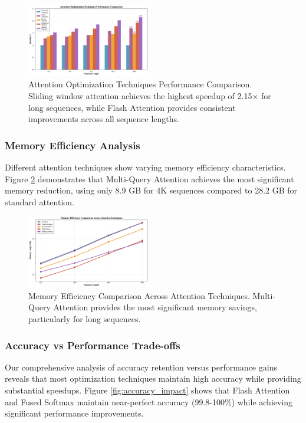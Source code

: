 \documentclass[conference]{IEEEtran}
\begin{document}
\begin{figure}[htbp]
\centering
\includegraphics[width=0.48\textwidth]{figures/attention_speedup_comparison.pdf}
\caption{Attention Optimization Techniques Performance Comparison. Sliding window attention achieves the highest speedup of 2.15× for long sequences, while Flash Attention provides consistent improvements across all sequence lengths.}
\label{fig:attention_speedup}
\end{figure}

\subsubsection{Memory Efficiency Analysis}

Different attention techniques show varying memory efficiency characteristics. Figure \ref{fig:memory_efficiency} demonstrates that Multi-Query Attention achieves the most significant memory reduction, using only 8.9 GB for 4K sequences compared to 28.2 GB for standard attention.

\begin{figure}[htbp]
\centering
\includegraphics[width=0.48\textwidth]{figures/attention_memory_efficiency.pdf}
\caption{Memory Efficiency Comparison Across Attention Techniques. Multi-Query Attention provides the most significant memory savings, particularly for long sequences.}
\label{fig:memory_efficiency}
\end{figure}

\subsubsection{Accuracy vs Performance Trade-offs}

Our comprehensive analysis of accuracy retention versus performance gains reveals that most optimization techniques maintain high accuracy while providing substantial speedups. Figure \ref{fig:accuracy_impact} shows that Flash Attention and Fused Softmax maintain near-perfect accuracy (99.8-100\%) while achieving significant performance improvements.
\end{document}
